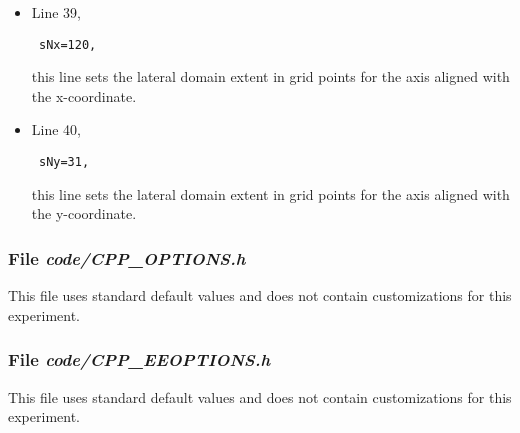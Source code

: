 \begin{itemize}

\item Line 39, 
\begin{verbatim} sNx=120, \end{verbatim} this line sets
the lateral domain extent in grid points for the
axis aligned with the x-coordinate.

\item Line 40, 
\begin{verbatim} sNy=31, \end{verbatim} this line sets
the lateral domain extent in grid points for the
axis aligned with the y-coordinate.

\end{itemize}

\begin{small}

\end{small}

\subsubsection{File {\it code/CPP\_OPTIONS.h}}
\label{www:tutorials}

This file uses standard default values and does not contain
customizations for this experiment.


\subsubsection{File {\it code/CPP\_EEOPTIONS.h}}
\label{www:tutorials}

This file uses standard default values and does not contain
customizations for this experiment.

